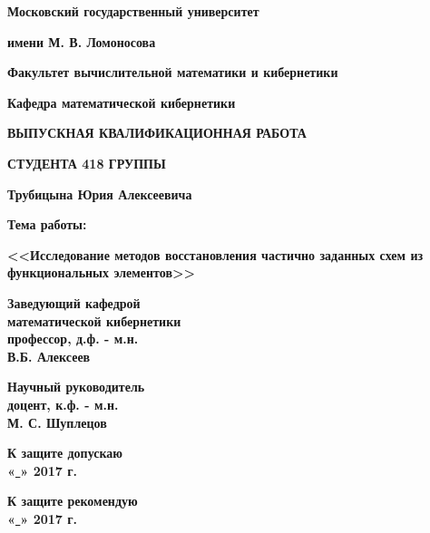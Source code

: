 \documentclass[a4paper]{article}
\begin{document}
\Large


\centerline{ {\bf Московский государственный университет} }
\centerline{{\bf имени М. В. Ломоносова} }

\vspace{\baselineskip}

\centerline{ {\bf Факультет вычислительной математики и кибернетики} }
\centerline{{\bf Кафедра математической кибернетики} }

\vfill
\vfill

\centerline {{\bf ВЫПУСКНАЯ КВАЛИФИКАЦИОННАЯ РАБОТА}}
\centerline {{\bf СТУДЕНТА 418 ГРУППЫ}}

\centerline {{\bf Трубицына Юрия Алексеевича}}

\vfill
\vfill

\centerline {{\bf Тема работы:}}

\begin{center}
 {{\bf <<Исследование методов восстановления частично заданных схем из функциональных элементов>>}}
\end{center}

\vfill
\vfill

\begin{minipage}{0.45\textwidth}
{\bf Заведующий кафедрой} \\
{\bf математической кибернетики} \\
{\bf профессор, д.ф. - м.н.} \\
{\bf В.Б. Алексеев }
\end{minipage}
\hfill
\begin{minipage}{0.4\textwidth}
{\bf Научный руководитель} \\
{\bf доцент, к.ф. - м.н.}\\
{\bf М. С. Шуплецов }
\end{minipage}

\vfill

\begin{minipage}{0.45\textwidth}
{\bf К защите допускаю} \\
{\bf «\underline{ }\underline{ }\underline{ }\underline{ }»
\underline{ }\underline{ }\underline{ }\underline{ }\underline{ }\underline{ }\underline{ }\underline{ }\underline{ }\underline{ }\underline{ }\underline{ }\underline{ }\underline{ }\underline{ }\underline{ }\underline{ } 2017 г.}
\end{minipage}
\hfill
\begin{minipage}{0.4\textwidth}
{\bf К защите рекомендую} \\
{\bf «\underline{ }\underline{ }\underline{ }\underline{ }»
\underline{ }\underline{ }\underline{ }\underline{ }\underline{ }\underline{ }\underline{ }\underline{ }\underline{ }\underline{ }\underline{ }\underline{ }\underline{ }\underline{ }\underline{ }\underline{ }\underline{ } 2017 г.}
\end{minipage}
\end{document}
